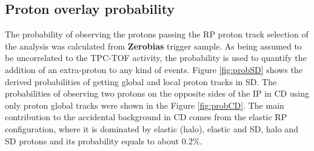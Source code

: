 \subsection{Proton overlay probability}
The probability of observing the protons passing the RP proton track selection of the analysis  was calculated from \textbf{Zerobias} trigger sample. As being assumed to be uncorrelated to the TPC-TOF activity, the probability is used to quantify the addition of an extra-proton to any kind of events. Figure \ref{fig:probSD} shows the derived probabilities of getting global and local proton tracks in SD. The probabilities of observing two protons on the opposite sides of the IP in CD using only proton global tracks were shown in the Figure \ref{fig:probCD}.  The main contribution to the accidental background in CD comes from the elastic RP configuration, where it is dominated by elastic (halo), elastic and SD, halo and SD protons and its probability equals to about $0.2\%$.
